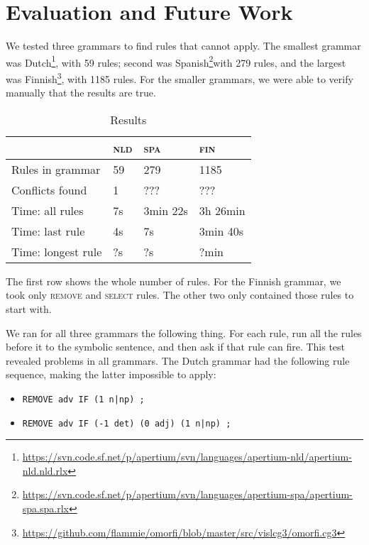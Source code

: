 \section{Evaluation and Future Work}
\label{sec:eval}

We tested three grammars to find rules that cannot apply. The smallest grammar was Dutch\footnote{\url{https://svn.code.sf.net/p/apertium/svn/languages/apertium-nld/apertium-nld.nld.rlx}}, with 59 rules; second was Spanish\footnote{\url{https://svn.code.sf.net/p/apertium/svn/languages/apertium-spa/apertium-spa.spa.rlx}}with 279 rules, and the largest was Finnish\footnote{\url{https://github.com/flammie/omorfi/blob/master/src/vislcg3/omorfi.cg3}}, with 1185 rules.
For the smaller grammars, we were able to verify manually that the results are true.

\begin{table}[]
\centering
\begin{tabular}{|l|l|l|l|}
\hline
                      & \textsc{nld}  & \textsc{spa}  & \textsc{fin}  \\ \hline
Rules in grammar      & 59              & 279               & 1185     \\ \hline
Conflicts found       & 1               & ???               & ???    \\ \hline
Time: all rules       & 7s              & 3min 22s          & 3h 26min    \\ \hline
Time: last rule       & 4s              & 7s                & 3min 40s    \\ \hline
Time: longest rule    & ?s              & ?s                & ?min     \\ \hline

\end{tabular}
\caption{Results}
\label{table:res}
\end{table}

The first row shows the whole number of rules. For the Finnish grammar, we took only \textsc{remove} and \textsc{select} rules. The other two only contained those rules to start with.

We ran for all three grammars the following thing.
For each rule, run all the rules before it to the symbolic sentence, and then ask if that rule can fire.
This test revealed problems in all grammars.
The Dutch grammar had the following rule sequence, making the latter impossible to apply:

\begin{itemize}
\item[] \texttt{REMOVE adv IF (1 n|np) ;}
\item[] \texttt{REMOVE adv IF (-1 det) (0 adj) (1 n|np) ;}
\end{itemize}

